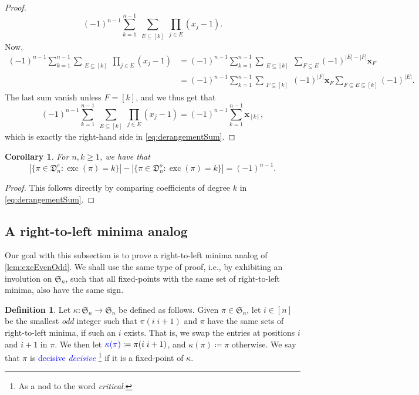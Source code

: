 \documentclass[reqno]{amsart}
\newtheorem{corollary}[theorem]{Corollary}
\theoremstyle{definition}
\newtheorem{definition}[theorem]{Definition}
\newcommand{\defin}[1]{%
\relax\ifmmode%
\textcolor{blue}{#1}%
\else\textcolor{blue}{\emph{#1}}%
\fi%
}
\newcommand{\xvec}{\mathbf{x}}
\newcommand{\symS}{\mathfrak{S}}
\newcommand{\dArr}{\mathfrak{D}}
\DeclareMathOperator{\exc}{exc}
\begin{document}
\begin{proof}
 \[
(-1)^{n-1}
 \sum_{k=1}^{n-1} 
 \sum_{\substack{E \subseteq [k]}} 
 \prod_{ j \in E } (x_j-1).
\]
Now,
\begin{align*}
(-1)^{n-1}
\sum_{k=1}^{n-1} 
\sum_{\substack{E \subseteq [k]}} 
\prod_{ j \in E } (x_j-1)
&=
(-1)^{n-1}
\sum_{k=1}^{n-1} 
\sum_{\substack{E \subseteq [k]}} 
\sum_{F \subseteq E} (-1)^{|E|-|F|}\xvec_F \\
&=
(-1)^{n-1}
\sum_{k=1}^{n-1} 
\sum_{\substack{F \subseteq [k]}} 
(-1)^{|F|}\xvec_F
\sum_{F \subseteq E \subseteq [k]} (-1)^{|E|}.
\end{align*}
The last sum vanish unless $F=[k]$, and we thus get that 
\begin{equation}
(-1)^{n-1}
\sum_{k=1}^{n-1} 
\sum_{\substack{E \subseteq [k]}} 
\prod_{ j \in E } (x_j-1)
=
(-1)^{n-1}\sum_{k=1}^{n-1} \xvec_{[k]},
\end{equation}
which is exactly the right-hand side in \eqref{eq:derangementSum}.
\end{proof}


\begin{corollary}
For $n,k \geq 1$, we have that
\[
|\{ \pi \in \dArr^e_n : \exc(\pi) = k \}|-|\{ \pi \in \dArr^o_n : \exc(\pi) = k \}| = (-1)^{n-1}.
\]
\end{corollary}
\begin{proof}
 This follows directly by comparing
 coefficients of degree $k$ in \eqref{eq:derangementSum}.
\end{proof}




\subsection{A right-to-left minima analog}

Our goal with this subsection is to prove 
a right-to-left minima analog of \cref{lem:excEvenOdd}.
We shall use the same type of proof, i.e., by exhibiting an involution on $\symS_n$,
such that all fixed-points with the same set of right-to-left minima,
also have the same sign.

\begin{definition}
Let $\kappa : \symS_n \to \symS_n$ be defined as follows.
Given $\pi \in \symS_n$, let $i \in [n]$ be the smallest \emph{odd} integer 
such that $\pi (i \; i+1)$ and $\pi$ have the same sets of right-to-left minima,
if such an $i$ exists. That is, we swap the entries at positions $i$ and $i+1$ in $\pi$.
%
We then let $\defin{\kappa(\pi)} \coloneqq \pi (i \; i+1)$,
and $\kappa(\pi) \coloneqq \pi$ otherwise.
We say that $\pi$ is \defin{decisive}\footnote{As a nod to the word \emph{critical}.}
if it is a fixed-point of $\kappa$.
\end{definition}
\end{document}
